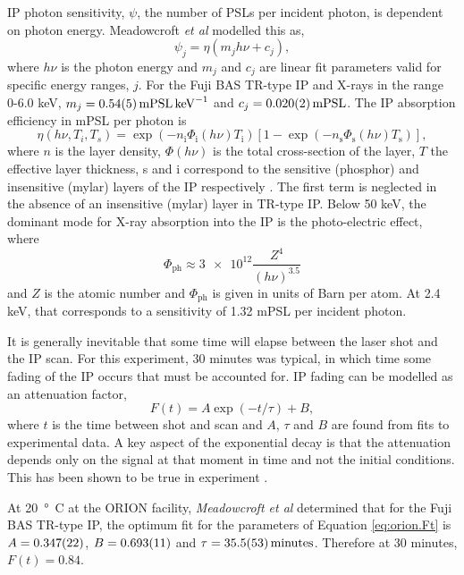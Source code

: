 IP photon sensitivity, $\psi$, the number of PSLs per incident photon, is dependent on photon energy. Meadowcroft \textit{et al} modelled this as,
\begin{equation}
	\psi_j = \eta(m_jh\nu + c_j),
\end{equation}
where $h\nu$ is the photon energy and $m_j$ and $c_j$ are linear fit parameters valid for specific energy ranges, $j$. For the Fuji BAS TR-type IP and X-rays in the range 0-6.0 keV, $m_j = \qty{0.54\pm0.05}{mPSL.keV^{-1}}$ and $c_j = \qty{0.02\pm0.002}{mPSL}$. The IP absorption efficiency in mPSL per photon is
\begin{equation}
	\eta(h\nu,T_i,T_s) = \exp{(-n_\mathrm{i}\Phi_\mathrm{i} (h\nu)T_\mathrm{i})}[1-\exp{(-n_\mathrm{s}\Phi_\mathrm{s}(h\nu)T_\mathrm{s})}],
\end{equation}
where $n$ is the layer density, $\Phi(h\nu)$ is the total cross-section of the layer, $T$ the effective layer thickness, s and i correspond to the sensitive (phosphor) and insensitive (mylar) layers of the IP respectively \cite{izumiApplicationImagingPlates2006}. The first term is neglected in the absence of an insensitive (mylar) layer in TR-type IP. Below 50 keV, the dominant mode for X-ray absorption into the IP is the photo-electric effect, where
\begin{equation}
	\Phi_\mathrm{ph} \approx \num{3e12}\frac{Z^4}{(h\nu)^{3.5}}   
\end{equation}
and $Z$ is the atomic number \cite{fornalskiSimpleEmpiricalCorrection2018} and $\Phi_\mathrm{ph}$ is given in units of Barn per atom. At 2.4 keV, that corresponds to a sensitivity of 1.32 mPSL per incident photon.

It is generally inevitable that some time will elapse between the laser shot and the IP scan. For this experiment, 30 minutes was typical, in which time some fading of the IP occurs that must be accounted for. IP fading can be modelled as an attenuation factor,
\begin{equation}\label{eq:orion.Ft}
	F(t) = A\exp{(-t/\tau)} + B,
\end{equation}
where $t$ is the time between shot and scan and $A$, $\tau$ and $B$ are found from fits to experimental data. A key aspect of the exponential decay is that the attenuation depends only on the signal at that moment in time and not the initial conditions. This has been shown to be true in experiment \cite{meadowcroftEvaluationSensitivityFading2008}.

At \qty{20}{\degree C} at the ORION facility, \textit{Meadowcroft et al} \cite{meadowcroftEvaluationSensitivityFading2008} determined that for the Fuji BAS TR-type IP, the optimum fit for the parameters of Equation \ref{eq:orion.Ft} is $A = \num{0.347\pm0.022}$, $B = \num{0.693\pm0.011}$ and $\tau = \qty{35.5\pm5.3}{minutes}$. Therefore at 30 minutes, $F(t) = 0.84$.

